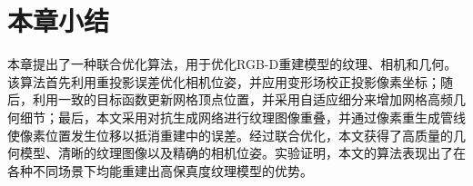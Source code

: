 \section{本章小结}

本章提出了一种联合优化算法，用于优化RGB-D重建模型的纹理、相机和几何。该算法首先利用重投影误差优化相机位姿，并应用变形场校正投影像素坐标；随后，利用一致的目标函数更新网格顶点位置，并采用自适应细分来增加网格高频几何细节；最后，本文采用对抗生成网络进行纹理图像重叠，并通过像素重生成管线使像素位置发生位移以抵消重建中的误差。经过联合优化，本文获得了高质量的几何模型、清晰的纹理图像以及精确的相机位姿。实验证明，本文的算法表现出了在各种不同场景下均能重建出高保真度纹理模型的优势。

